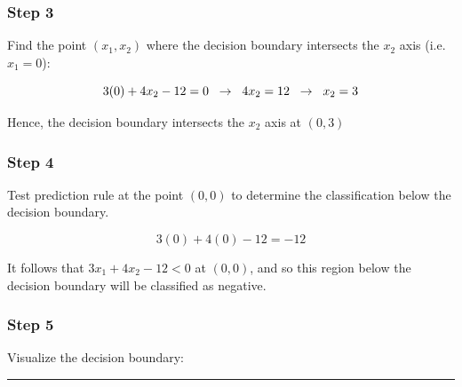 \documentclass{article}
\begin{document}
\subsubsection*{Step 3}
\parbox{\textwidth}{
Find the point $(x_{1},x_{2})$ where the decision boundary intersects the $x_{2}$ axis (i.e. $x_{1}=0$):

$$3(0) + 4x_2 - 12 = 0 \hspace{0.2cm} \rightarrow \hspace{0.2cm} 4x_2 = 12 \hspace{0.2cm} \rightarrow \hspace{0.2cm} x_2 = 3$$

Hence, the decision boundary intersects the $x_{2}$ axis at $(0,3)$
}

\subsubsection*{Step 4}
\parbox{\textwidth}{
Test prediction rule at the point $(0,0)$ to determine the classification below the decision boundary.

$$3(0) + 4(0) - 12 = -12$$

It follows that $3x_1 + 4x_2 - 12 < 0$ at $(0,0)$, and so this region below the decision boundary will be classified as negative.
}

\subsubsection*{Step 5}
\parbox{\textwidth}{
Visualize the decision boundary:
}

\begin{center}
\end{center}

\noindent\rule{\textwidth}{0.4pt}\\
\end{document}
